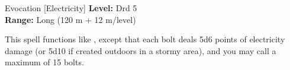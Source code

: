 {Evocation [Electricity]}
{
	\textbf{Level:}
	Drd 5\\
	\textbf{Range:}
	Long (120 m + 12 m/level)\\
}
{
	This spell functions like , except that each bolt deals 5d6 points of electricity damage (or 5d10 if created outdoors in a stormy area), and you may call a maximum of 15 bolts.

}
